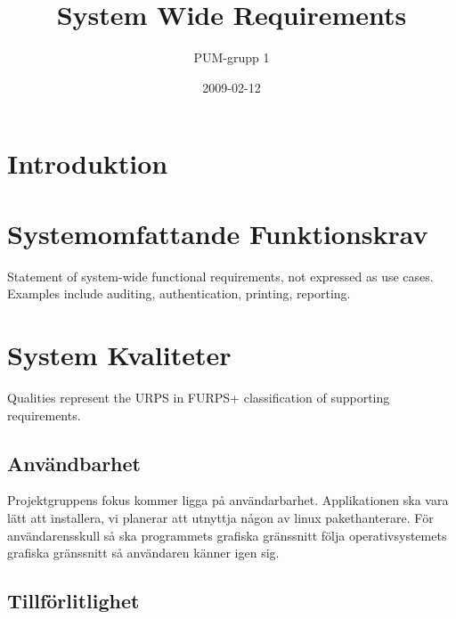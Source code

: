 

\ifpdf
\else
\fi

\title{System Wide Requirements}
\author{PUM-grupp 1}
\date{2009-02-12}



\maketitle\thispagestyle{empty}

\newpage

\setcounter{tocdepth}{2}
\tableofcontents
\newpage

\section{Introduktion}

\section{Systemomfattande Funktionskrav}

Statement of system-wide functional requirements, not expressed as use cases. Examples include auditing, authentication, printing, reporting.

\section{System Kvaliteter}

Qualities represent the URPS in FURPS+ classification of supporting requirements.

\subsection{Användbarhet}
Projektgruppens fokus kommer ligga på användarbarhet. Applikationen ska vara lätt att installera, vi planerar att utnyttja någon av linux pakethanterare. För användarensskull så ska programmets grafiska gränssnitt följa operativsystemets grafiska gränssnitt så användaren känner igen sig. 

\subsection{Tillförlitlighet}

